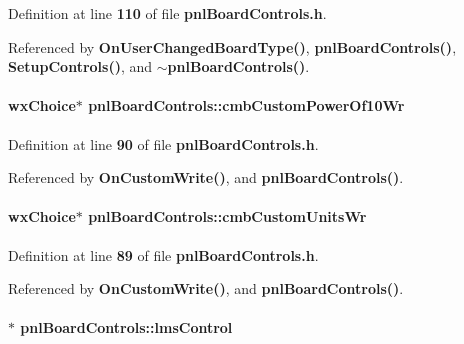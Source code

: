 Definition at line {\bf 110} of file {\bf pnl\+Board\+Controls.\+h}.



Referenced by {\bf On\+User\+Changed\+Board\+Type()}, {\bf pnl\+Board\+Controls()}, {\bf Setup\+Controls()}, and {\bf $\sim$pnl\+Board\+Controls()}.

\paragraph[{cmb\+Custom\+Power\+Of10\+Wr}]{\setlength{\rightskip}{0pt plus 5cm}wx\+Choice$\ast$ pnl\+Board\+Controls\+::cmb\+Custom\+Power\+Of10\+Wr\hspace{0.3cm}{\ttfamily [protected]}}\label{classpnlBoardControls_a22a07c1c7279121fbca81dec9884f0ce}


Definition at line {\bf 90} of file {\bf pnl\+Board\+Controls.\+h}.



Referenced by {\bf On\+Custom\+Write()}, and {\bf pnl\+Board\+Controls()}.

\paragraph[{cmb\+Custom\+Units\+Wr}]{\setlength{\rightskip}{0pt plus 5cm}wx\+Choice$\ast$ pnl\+Board\+Controls\+::cmb\+Custom\+Units\+Wr\hspace{0.3cm}{\ttfamily [protected]}}\label{classpnlBoardControls_ac724e108b6b4c3e18c138eeb09252ee1}


Definition at line {\bf 89} of file {\bf pnl\+Board\+Controls.\+h}.



Referenced by {\bf On\+Custom\+Write()}, and {\bf pnl\+Board\+Controls()}.

\paragraph[{lms\+Control}]{$\ast$ pnl\+Board\+Controls\+::lms\+Control}\label{classpnlBoardControls_a03949237852db9f12268f0c7762ec89e}


